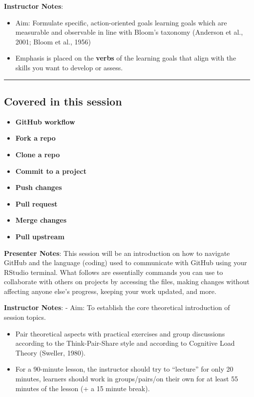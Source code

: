 \documentclass[
  letterpaper,
  DIV=11,
  numbers=noendperiod]{scrartcl}
\providecommand{\tightlist}{%
  \setlength{\itemsep}{0pt}\setlength{\parskip}{0pt}}
\begin{document}
\textbf{Instructor Notes}:

\begin{itemize}
\item
  Aim: Formulate specific, action-oriented goals learning goals which
  are measurable and observable in line with Bloom's taxonomy (Anderson
  et al., 2001; Bloom et al., 1956)
\item
  Emphasis is placed on the \textbf{verbs} of the learning goals that
  align with the skills you want to develop or assess.
\end{itemize}

\begin{center}\rule{0.5\linewidth}{0.5pt}\end{center}

\subsection{Covered in this session}\label{covered-in-this-session}

\begin{itemize}
\tightlist
\item
  \textbf{GitHub workflow}
\item
  \textbf{Fork a repo}
\item
  \textbf{Clone a repo}
\item
  \textbf{Commit to a project}
\item
  \textbf{Push changes}
\item
  \textbf{Pull request}
\item
  \textbf{Merge changes}
\item
  \textbf{Pull upstream}
\end{itemize}

\textbf{Presenter Notes}: This session will be an introduction on how to
navigate GitHub and the language (coding) used to communicate with
GitHub using your RStudio terminal. What follows are essentially
commands you can use to collaborate with others on projects by accessing
the files, making changes without affecting anyone else's progress,
keeping your work updated, and more.

\textbf{Instructor Notes}: - Aim: To establish the core theoretical
introduction of session topics.

\begin{itemize}
\item
  Pair theoretical aspects with practical exercises and group
  discussions according to the Think-Pair-Share style and according to
  Cognitive Load Theory (Sweller, 1980).
\item
  For a 90-minute lesson, the instructor should try to ``lecture'' for
  only 20 minutes, learners should work in groups/pairs/on their own for
  at least 55 minutes of the lesson (+ a 15 minute break).
\end{itemize}
\end{document}
